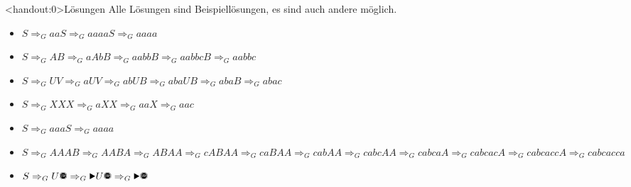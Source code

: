 {
\begin{frame}<handout:0>{Lösungen}
Alle Lösungen sind Beispiellösungen, es sind auch andere möglich.
    \begin{itemize}[<+- | alert@+>]
        \item $S\Rightarrow_G aaS \Rightarrow_G aaaaS \Rightarrow_G aaaa$
        \item $S\Rightarrow_G AB \Rightarrow_G aAbB \Rightarrow_G aabbB \Rightarrow_G aabbcB \Rightarrow_G aabbc$
        \item $S\Rightarrow_G UV \Rightarrow_G aUV \Rightarrow_G abUB \Rightarrow_G abaUB \Rightarrow_G abaB \Rightarrow_G abac$
        \item $S\Rightarrow_G XXX \Rightarrow_G aXX \Rightarrow_G aaX \Rightarrow_G aac$
        \item $S\Rightarrow_G aaaS \Rightarrow_G aaaa$
        \item $S\Rightarrow_G AAAB \Rightarrow_G AABA \Rightarrow_G ABAA \Rightarrow_G cABAA \Rightarrow_G caBAA \Rightarrow_G cabAA \Rightarrow_G cabcAA \Rightarrow_G cabcaA\Rightarrow_G cabcacA \Rightarrow_G cabcaccA \Rightarrow_G cabcacca$
        \item $S\Rightarrow_G U\text{\Stopsign} \Rightarrow_G \text{\Forward}U\text{\Stopsign} \Rightarrow_G \text{\Forward}\text{\Stopsign}$
    \end{itemize}
\end{frame}
}  
